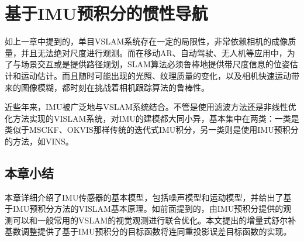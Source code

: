 \chapter{基于IMU预积分的惯性导航}\label{ch:vislam}

如上一章中提到的，单目VSLAM系统存在一定的局限性，非常依赖相机的成像质量，并且无法绝对尺度进行观测\citep{jones2011visual}。而在移动AR、自动驾驶、无人机等应用中，为了与场景交互或是提供路径规划，SLAM算法必须鲁棒地提供带尺度信息的位姿估计和运动估计。而且随时可能出现的光照、纹理质量的变化，以及相机快速运动带来的图像模糊，都时刻在挑战着相机跟踪算法的鲁棒性。

近些年来，IMU被广泛地与VSLAM系统结合。不管是使用滤波方法还是非线性优化方法实现的VISLAM系统，对IMU的建模都大同小异，基本集中在两类：一类是类似于MSCKF\citep{mourikis2007multi}、OKVIS\citep{leutenegger2015keyframe}那样传统的迭代式IMU积分，另一类则是使用IMU预积分\citep{forster2017manifold}的方法，如VINS\citep{li2017monocular}。



\section{本章小结}

本章详细介绍了IMU传感器的基本模型，包括噪声模型和运动模型，并给出了基于IMU预积分方法的VISLAM基本原理。如前面提到的，由IMU预积分提供的观测可以和一般常用的VSLAM的视觉观测进行联合优化。本文提出的增量式舒尔补基数调整提供了基于IMU预积分的目标函数将连同重投影误差目标函数的实现。
